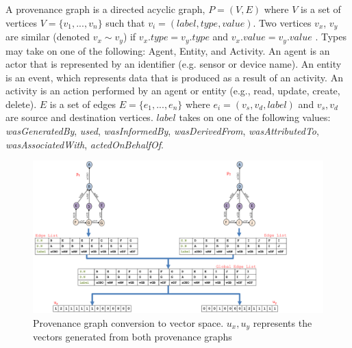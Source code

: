 \begin{definition}

A provenance graph is a directed acyclic graph, $P = (V,E)$ where $V$ is a set of vertices $V =\{v_1,...,v_n\}$ such that $v_i = (label, type, value)$. Two vertices $v_x$, $v_y$ are similar (denoted $ v_x \sim v_y$) if $v_x.type = v_y.type$ and $v_x.value = v_y.value$ . Types may take on one of the following: Agent, Entity, and Activity.  An agent is an actor that is represented by an identifier (e.g. sensor or device name). An entity is an event, which represents data that is produced as a result of an activity. An activity is an action performed by an agent or entity (e.g., read, update, create, delete). $E$ is a set of edges $E =\{e_1,..., e_n\}$ where $e_i = (v_s, v_d, label)$ and $v_s, v_d$ are source and destination vertices. $label$ takes on one of the following values: \textit{wasGeneratedBy}, \textit{used}, \textit{wasInformedBy}, \textit{wasDerivedFrom}, \textit{wasAttributedTo}, \textit{wasAssociatedWith}, \textit{actedOnBehalfOf}. 




\end{definition}


\begin{figure}
\begin{center}
\includegraphics[width=\textwidth]{vector6.pdf}
\end{center}
\caption{Provenance graph conversion to vector space. $u_x, u_y$ represents the vectors generated from both provenance graphs}
\label{prov_vector}
\end{figure}



